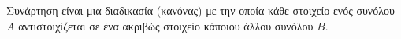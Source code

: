 Συνάρτηση είναι μια διαδικασία (κανόνας) με την οποία κάθε στοιχείο ενός συνόλου $A$ αντιστοιχίζεται σε ένα ακριβώς στοιχείο κάποιου άλλου συνόλου $B$.
